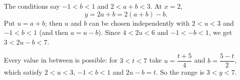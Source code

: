 The conditions say $-1<b<1$ and $2<a+b<3$. At $x=2$,
\[
y=2a+b=2(a+b)-b .
\]
Put $u=a+b$; then $u$ and $b$ can be chosen independently with $2<u<3$ and $-1<b<1$ (and then $a=u-b$). Since $4<2u<6$ and $-1<-b<1$, we get $3<2u-b<7$.

Every value in between is possible: for $3<t<7$ take $u=\dfrac{t+5}{4}$ and $b=\dfrac{5-t}{2}$, which satisfy $2<u<3$, $-1<b<1$ and $2u-b=t$. So the range is $\boxed{3<y<7}$.
